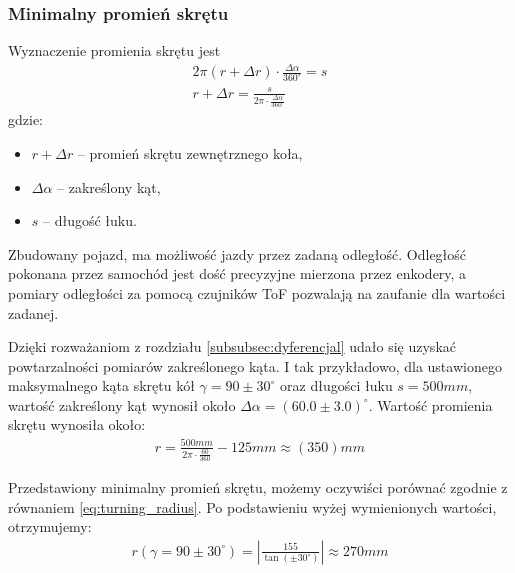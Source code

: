         \subsubsection{Minimalny promień skrętu}
        \label{subsubsec:minamalny_promien}
            Wyznaczenie promienia skrętu jest 
            \begin{gather}
                2\pi (r + \Delta r) \cdot \frac{\Delta \alpha}{360^\circ} = s\\
                r + \Delta r = \frac{s}{2\pi \cdot \frac{\Delta \alpha}{360^\circ}}
            \end{gather}
            gdzie:
            \begin{itemize}
                \item $r + \Delta r$ -- promień skrętu zewnętrznego koła,
                \item $\Delta \alpha$ -- zakreślony kąt,
                \item $s$ -- długość łuku.
            \end{itemize}

            Zbudowany pojazd, ma możliwość jazdy przez zadaną odległość. 
            Odległość pokonana przez samochód jest dość precyzyjne mierzona przez enkodery,
            a pomiary odległości za pomocą czujników ToF pozwalają na zaufanie dla wartości zadanej.

            Dzięki rozważaniom z rozdziału \ref{subsubsec:dyferencjal} udało się uzyskać powtarzalności pomiarów zakreślonego kąta.
            I tak przykładowo, dla ustawionego maksymalnego kąta skrętu kół $\gamma = 90 \pm 30^\circ$ oraz długości łuku $s = 500mm$, wartość zakreślony kąt wynosił około $\Delta \alpha = \left(60.0 \pm 3.0\right)^\circ$.
            Wartość promienia skrętu wynosiła około:
            \begin{gather}
                r = \frac{500mm}{2\pi \cdot \frac{60}{360}} - 125mm \approx (350)mm
            \end{gather}

            Przedstawiony minimalny promień skrętu, możemy oczywiści porównać zgodnie z równaniem \eqref{eq:turning_radius}.
            Po podstawieniu wyżej wymienionych wartości, otrzymujemy:
            \begin{gather}
                r(\gamma = 90 \pm 30^\circ) = \left|\frac{155}{\tan(\pm 30^\circ)}\right| \approx 270mm
            \end{gather}

